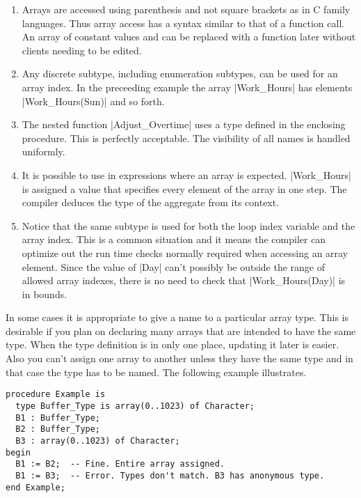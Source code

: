 \begin{enumerate}

\item Arrays are accessed using parenthesis and not square brackets as in C family languages.
  Thus array access has a syntax similar to that of a function call. An array of constant values
  and can be replaced with a function later without clients needing to be edited.

\item Any discrete subtype, including enumeration subtypes, can be used for an array index. In
  the preceeding example the array |Work_Hours| has elements |Work_Hours(Sun)| and so forth.

\item The nested function |Adjust_Overtime| uses a type defined in the enclosing procedure. This
  is perfectly acceptable. The visibility of all names is handled uniformly.

\item It is possible to use  in expressions where an array is
  expected. |Work_Hours| is assigned a value that specifies every element of the array in one
  step. The compiler deduces the type of the aggregate from its context.

\item Notice that the same subtype is used for both the loop index variable and the array index.
  This is a common situation and it means the compiler can optimize out the run time checks
  normally required when accessing an array element. Since the value of |Day| can't possibly be
  outside the range of allowed array indexes, there is no need to check that |Work_Hours(Day)|
  is in bounds.

\end{enumerate}

In some cases it is appropriate to give a name to a particular array type. This is desirable if
you plan on declaring many arrays that are intended to have the same type. When the type
definition is in only one place, updating it later is easier. Also you can't assign one array to
another unless they have the same type and in that case the type has to be named. The following
example illustrates.

\begin{lstlisting}
procedure Example is
  type Buffer_Type is array(0..1023) of Character;
  B1 : Buffer_Type;
  B2 : Buffer_Type;
  B3 : array(0..1023) of Character;
begin
  B1 := B2;  -- Fine. Entire array assigned.
  B1 := B3;  -- Error. Types don't match. B3 has anonymous type.
end Example;
\end{lstlisting}

